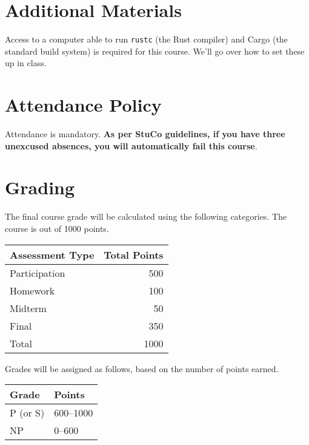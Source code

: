 \documentclass{article}
\begin{document}
\section*{Additional Materials}

Access to a computer able to run \texttt{rustc} (the Rust compiler) and Cargo
(the standard build system) is required for this course. We'll go over how to
set these up in class.

\section*{Attendance Policy}

Attendance is mandatory. \textbf{As per StuCo guidelines, if you have three
unexcused absences, you will automatically fail this course}.

\section*{Grading}

The final course grade will be calculated using the following categories. The
course is out of 1000 points.

\begin{center}
    \begin{tabular}{@{}lr@{}}
        Assessment Type     & Total Points \\ \toprule
        Participation       &          500 \\
        Homework            &          100 \\
        Midterm             &           50 \\
        Final               &          350 \\ \midrule
        Total               &         1000 \\ \bottomrule
    \end{tabular}
\end{center}

Grades will be assigned as follows, based on the number of points earned.

\begin{center}
    \begin{tabular}{@{}ll@{}}
        Grade    & Points    \\ \toprule
        P (or S) & 600--1000 \\
        NP       & 0--600    \\ \bottomrule
    \end{tabular}
\end{center}
\end{document}
